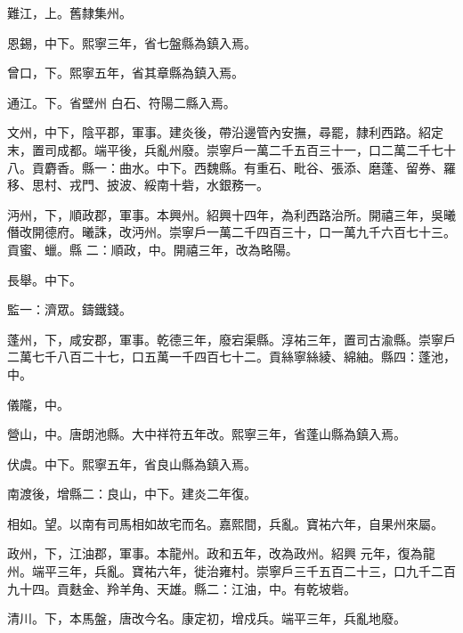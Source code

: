 \begin{pinyinscope}
 難江，上。舊隸集州。



 恩錫，中下。熙寧三年，省七盤縣為鎮入焉。



 曾口，下。熙寧五年，省其章縣為鎮入焉。



 通江。下。省壁州
 白石、符陽二縣入焉。



 文州，中下，陰平郡，軍事。建炎後，帶沿邊管內安撫，尋罷，隸利西路。紹定末，置司成都。端平後，兵亂州廢。崇寧戶一萬二千五百三十一，口二萬二千七十八。貢麝香。縣一：曲水。中下。西魏縣。有重石、毗谷、張添、磨蓬、留券、羅移、思村、戎門、披波、綏南十砦，水銀務一。



 沔州，下，順政郡，軍事。本興州。紹興十四年，為利西路治所。開禧三年，吳曦僭改開德府。曦誅，改沔州。崇寧戶一萬二千四百三十，口一萬九千六百七十三。貢蜜、蠟。縣
 二：順政，中。開禧三年，改為略陽。



 長舉。中下。



 監一：濟眾。鑄鐵錢。



 蓬州，下，咸安郡，軍事。乾德三年，廢宕渠縣。淳祐三年，置司古渝縣。崇寧戶二萬七千八百二十七，口五萬一千四百七十二。貢絲寧絲綾、綿紬。縣四：蓬池，中。



 儀隴，中。



 營山，中。唐朗池縣。大中祥符五年改。熙寧三年，省蓬山縣為鎮入焉。



 伏虞。中下。熙寧五年，省良山縣為鎮入焉。



 南渡後，增縣二：良山，中下。建炎二年復。



 相如。望。以南有司馬相如故宅而名。嘉熙間，兵亂。寶祐六年，自果州來屬。



 政州，下，江油郡，軍事。本龍州。政和五年，改為政州。紹興
 元年，復為龍州。端平三年，兵亂。寶祐六年，徙治雍村。崇寧戶三千五百二十三，口九千二百九十四。貢麩金、羚羊角、天雄。縣二：江油，中。有乾坡砦。



 清川。下，本馬盤，唐改今名。康定初，增戍兵。端平三年，兵亂地廢。




\end{pinyinscope}

